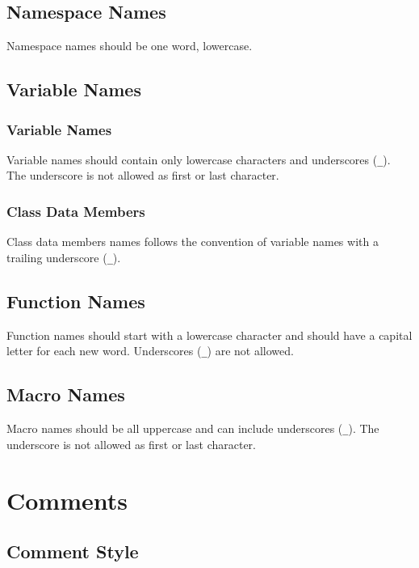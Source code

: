 \documentclass[a4paper]{article}
\newcommand{\inlinecode}[1]{\lstinline|#1|}
\begin{document}
\subsection{Namespace Names}

Namespace names should be one word, lowercase.

\subsection{Variable Names}

\subsubsection{Variable Names}

Variable names should contain only lowercase characters and underscores (\inlinecode{_}). The underscore is not allowed as first or last character.

\subsubsection{Class Data Members}

Class data members names follows the convention of variable names with a trailing underscore (\inlinecode{_}).

\subsection{Function Names}

Function names should start with a lowercase character and should have a capital letter for each new word. Underscores (\inlinecode{_}) are not allowed.

\subsection{Macro Names}

Macro names should be all uppercase and can include underscores (\inlinecode{_}). The underscore is not allowed as first or last character.

\section{Comments}

\subsection{Comment Style}
\end{document}
